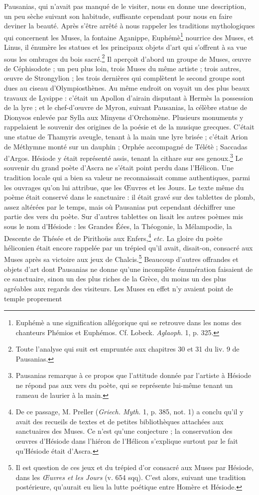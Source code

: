\documentclass[landscape, a4paper, 11pt, oneside, polutonikogreek, french]{article}
\begin{document}
Pausanias, qui n'avait pas manqué de le visiter, nous en donne une description, un peu sèche suivant son habitude, suffisante cependant pour nous en faire deviner la beauté. Après s'être arrêté à nous rappeler les traditions mythologiques qui concernent les Muses, la fontaine Aganippe, Euphémè\footnote{Euphémè a une signification allégorique qui se retrouve dans les noms des chanteurs Phémios et Euphémos. Cf. Lobeck. \emph{Aglaoph.} 1, p. 325.} nourrice des Muses, et Linus, il énumère les statues et les principaux objets d'art qui s'offrent à sa vue sous les ombrages du bois sacré.\footnote{Toute l'analyse qui suit est empruntée aux chapitres 30 et 31 du liv. 9 de Pausanias.} Il aperçoit d'abord un groupe de Muses, œuvre de Céphisodote ; un peu plus loin, trois Muses du même artiste ; trois autres, œuvre de Strongylion ; les trois dernières qui complètent le second groupe sont dues au ciseau d'Olympiosthènes. Au même endroit on voyait un des plus beaux travaux de Lysippe : c'était un Apollon d'airain disputant à Hermès la possession de la lyre ; et le chef-d'œuvre de Myron, suivant Pausanias, la célèbre statue de Dionysos enlevée par Sylla aux Minyens d'Orchomène. Plusieurs monuments y rappelaient le souvenir des origines de la poésie et de la musique grecques. C'était une statue de Thamyris aveugle, tenant à la main une lyre brisée ; c'était Arion de Méthymne monté sur un dauphin ; Orphée accompagné de Télétè ; Saccadas d'Argos. Hésiode y était représenté assis, tenant la cithare sur ses genoux.\footnote{Pausanias remarque à ce propos que l'attitude donnée par l'artiste à Hésiode ne répond pas aux vers du poète, qui se représente lui-même tenant un rameau de laurier à la main.} Le souvenir du grand poète d'Ascra ne s'était point perdu dans l'Hélicon. Une tradition locale qui a bien sa valeur ne reconnaissait comme authentiques, parmi les ouvrages qu'on lui attribue, que les Œuvres et les Jours. Le texte même du poème était conservé dans le sanctuaire : il était gravé sur des tablettes de plomb, assez altérées par le temps, mais où Pausanias put cependant déchiffrer une partie des vers du poète. Sur d'autres tablettes on lisait les autres poèmes mis sous le nom d'Hésiode : les Grandes Éées, la Théogonie, la Mélampodie, la Descente de Thésée et de Pirithoüs aux Enfers,\footnote{De ce passage, M. Preller (\emph{Griech. Myth.} 1, p. 385, not. 1) a conclu qu'il y avait des recueils de textes et de petites bibliothèques attachées aux sanctuaires des Muses. Ce n'est qu'une conjecture ; la conservation des œuvres d'Hésiode dans l'hiéron de l'Hélicon s'explique surtout par le fait qu'Hésiode était d'Ascra.} \emph{etc.} La gloire du poète héliconien était encore rappelée par un trépied qu'il avait, disait-on, consacré aux Muses après sa victoire aux jeux de Chalcis.\footnote{Il est question de ces jeux et du trépied d'or consacré aux Muses par Hésiode, dans les \emph{Œuvres et les Jours} (v. 654 sqq). C'est alors, suivant une tradition postérieure, qu'aurait eu lieu la lutte poétique entre Homère et Hésiode.} Beaucoup d'autres offrandes et objets d'art dont Pausanias ne donne qu'une incomplète énumération faisaient de ce sanctuaire, sinon un des plus riches de la Grèce, du moins un des plus agréables aux regards des visiteurs. Les Muses en effet n'y avaient point de temple proprement 
\end{document}
